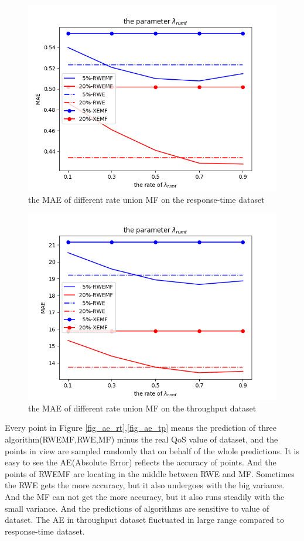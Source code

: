 \documentclass[conference]{IEEEtran}
\begin{document}
\begin{figure}[H] 
\centering  
\includegraphics[width=0.45\paperwidth]{rumf_rt.png}  
\caption{the MAE of different rate union MF on the response-time dataset }  
\label{fig_rumf_rt}  
\end{figure} 

\begin{figure}[H] 
\centering  
\includegraphics[width=0.45\paperwidth]{rumf_tp.png}  
\caption{the MAE of different rate union MF  on the throughput dataset }
\label{fig_rumf_tp}  
\end{figure} 

\par Every point in Figure \ref{fig_ae_rt},\ref{fig_ae_tp} means the prediction of three algorithm(RWEMF,RWE,MF) minus the real QoS value of dataset, and the points in view are sampled randomly that on behalf of the whole predictions. It is easy to see the AE(Absolute Error) reflects the accuracy of points. And the points of RWEMF are locating in the middle between RWE and MF. Sometimes the RWE gets the more accuracy, but it also undergoes with the big variance. And the MF can not get the more accuracy, but it also runs steadily with the small variance. And the predictions of algorithms are sensitive to value of dataset. The AE in throughput dataset fluctuated in large range compared to response-time dataset.
\end{document}
